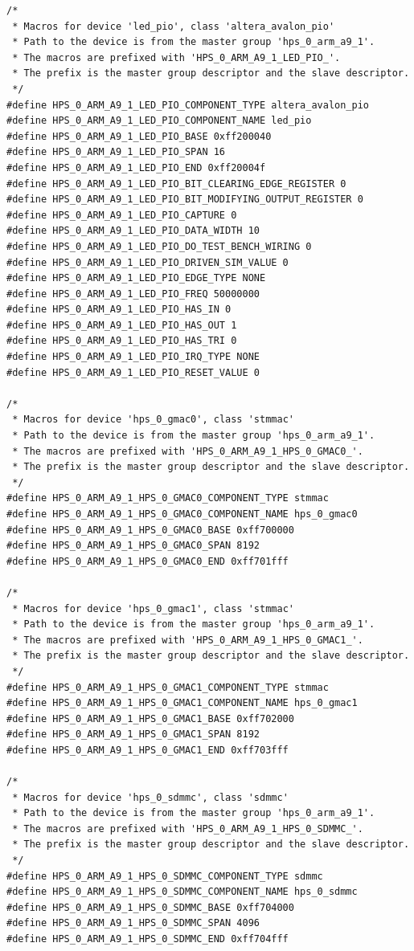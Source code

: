 \documentclass[conference]{IEEEtran}
\begin{document}
\begin{lstlisting}
/*
 * Macros for device 'led_pio', class 'altera_avalon_pio'
 * Path to the device is from the master group 'hps_0_arm_a9_1'.
 * The macros are prefixed with 'HPS_0_ARM_A9_1_LED_PIO_'.
 * The prefix is the master group descriptor and the slave descriptor.
 */
#define HPS_0_ARM_A9_1_LED_PIO_COMPONENT_TYPE altera_avalon_pio
#define HPS_0_ARM_A9_1_LED_PIO_COMPONENT_NAME led_pio
#define HPS_0_ARM_A9_1_LED_PIO_BASE 0xff200040
#define HPS_0_ARM_A9_1_LED_PIO_SPAN 16
#define HPS_0_ARM_A9_1_LED_PIO_END 0xff20004f
#define HPS_0_ARM_A9_1_LED_PIO_BIT_CLEARING_EDGE_REGISTER 0
#define HPS_0_ARM_A9_1_LED_PIO_BIT_MODIFYING_OUTPUT_REGISTER 0
#define HPS_0_ARM_A9_1_LED_PIO_CAPTURE 0
#define HPS_0_ARM_A9_1_LED_PIO_DATA_WIDTH 10
#define HPS_0_ARM_A9_1_LED_PIO_DO_TEST_BENCH_WIRING 0
#define HPS_0_ARM_A9_1_LED_PIO_DRIVEN_SIM_VALUE 0
#define HPS_0_ARM_A9_1_LED_PIO_EDGE_TYPE NONE
#define HPS_0_ARM_A9_1_LED_PIO_FREQ 50000000
#define HPS_0_ARM_A9_1_LED_PIO_HAS_IN 0
#define HPS_0_ARM_A9_1_LED_PIO_HAS_OUT 1
#define HPS_0_ARM_A9_1_LED_PIO_HAS_TRI 0
#define HPS_0_ARM_A9_1_LED_PIO_IRQ_TYPE NONE
#define HPS_0_ARM_A9_1_LED_PIO_RESET_VALUE 0

/*
 * Macros for device 'hps_0_gmac0', class 'stmmac'
 * Path to the device is from the master group 'hps_0_arm_a9_1'.
 * The macros are prefixed with 'HPS_0_ARM_A9_1_HPS_0_GMAC0_'.
 * The prefix is the master group descriptor and the slave descriptor.
 */
#define HPS_0_ARM_A9_1_HPS_0_GMAC0_COMPONENT_TYPE stmmac
#define HPS_0_ARM_A9_1_HPS_0_GMAC0_COMPONENT_NAME hps_0_gmac0
#define HPS_0_ARM_A9_1_HPS_0_GMAC0_BASE 0xff700000
#define HPS_0_ARM_A9_1_HPS_0_GMAC0_SPAN 8192
#define HPS_0_ARM_A9_1_HPS_0_GMAC0_END 0xff701fff

/*
 * Macros for device 'hps_0_gmac1', class 'stmmac'
 * Path to the device is from the master group 'hps_0_arm_a9_1'.
 * The macros are prefixed with 'HPS_0_ARM_A9_1_HPS_0_GMAC1_'.
 * The prefix is the master group descriptor and the slave descriptor.
 */
#define HPS_0_ARM_A9_1_HPS_0_GMAC1_COMPONENT_TYPE stmmac
#define HPS_0_ARM_A9_1_HPS_0_GMAC1_COMPONENT_NAME hps_0_gmac1
#define HPS_0_ARM_A9_1_HPS_0_GMAC1_BASE 0xff702000
#define HPS_0_ARM_A9_1_HPS_0_GMAC1_SPAN 8192
#define HPS_0_ARM_A9_1_HPS_0_GMAC1_END 0xff703fff

/*
 * Macros for device 'hps_0_sdmmc', class 'sdmmc'
 * Path to the device is from the master group 'hps_0_arm_a9_1'.
 * The macros are prefixed with 'HPS_0_ARM_A9_1_HPS_0_SDMMC_'.
 * The prefix is the master group descriptor and the slave descriptor.
 */
#define HPS_0_ARM_A9_1_HPS_0_SDMMC_COMPONENT_TYPE sdmmc
#define HPS_0_ARM_A9_1_HPS_0_SDMMC_COMPONENT_NAME hps_0_sdmmc
#define HPS_0_ARM_A9_1_HPS_0_SDMMC_BASE 0xff704000
#define HPS_0_ARM_A9_1_HPS_0_SDMMC_SPAN 4096
#define HPS_0_ARM_A9_1_HPS_0_SDMMC_END 0xff704fff


\end{lstlisting}
\end{document}
